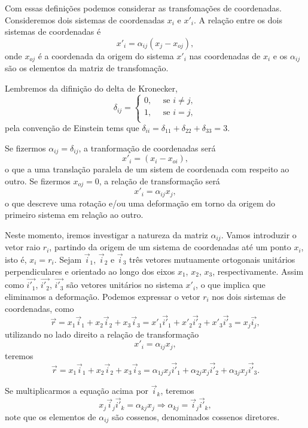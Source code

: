 Com essas defini\c{c}\~oes podemos considerar as
transfoma\c{c}\~oes de coordenadas. Consideremos dois sistemas de
 coordenadas $x_{i}$ e $x'_{i}$. A rela\c{c}\~ao entre os dois sistemas de coordenadas \'e
\[x'_{i}=\alpha_{ij}(x_{j}-x_{oj}),\]
onde $x_{oj}$ \'e a coordenada da origem do sistema $x'_{i}$ nas coordenadas de
$x_{i}$ e os $\alpha_{ij}$ s\~ao os elementos da matriz de
transfoma\c{c}\~ao.

Lembremos da difini\c{c}\~ao do delta de Kronecker,
\[\delta_{ij}=\left \{ \begin{array}{l}
                0, \mbox{   }\mbox{   }\mbox{se } i \neq j,\\
                1, \mbox{   }\mbox{   }\mbox{se } i= j,\\
\end{array} \right.\]
pela conven\c{c}\~ao de Einstein tems que
$\delta_{ii}=\delta_{11}+\delta_{22}+\delta_{33}=3$.

Se fizermos $\alpha_{ij}=\delta_{ij}$, a tranforma\c{c}\~ao de
coordenadas ser\'a
\[x'_{i}=(x_{i}-x_{oi}),\]
o que a uma transla\c{c}\~ao paralela de um sistem de coordenada
com respeito ao outro. Se fizermos  $x_{oj}=0$, a rela\c{c}\~ao de
transforma\c{c}\~ao ser\'a
\[x'_{i}=\alpha_{ij}x_{j},\]
o que descreve uma rota\c{c}\~ao e/ou uma deforma\c{c}\~ao em torno da origem do primeiro
sistema em rela\c{c}\~ao ao outro.

Neste momento, iremos investigar a natureza da matriz
$\alpha_{ij}$. Vamos introduzir o vetor raio $r_{i}$, partindo da
origem de um sistema de coordenadas at\'e um ponto $x_{i}$, isto
\'e, $x_{i}=r_{i}$. Sejam $\vec{i}_{1}$, $\vec{i}_{2}$ e
$\vec{i}_{3}$ tr\^es vetores mutuamente ortogonais unit\'arios
perpendiculares e orientado ao longo dos eixos $x_{1}$, $x_{2}$,
$x_{3}$, respectivamente. Assim como $\vec{i'_{1}}$,
$\vec{i'_{2}}$, $\vec{i'_{3}}$ s\~ao vetores unit\'arios no
sistema $x'_{i}$, o que implica que eliminamos a deforma\c{c}\~ao.
Podemos expressar o vetor $r_{i}$ nos dois sistemas de
coordenadas, como
\[ \vec{r}=x_{1}\vec{i}_{1}+x_{2}\vec{i}_{2}+x_{3}\vec{i}_{3}=x'_{1}\vec{i'}_{1}+
x'_{2}\vec{i'}_{2}+x'_{3}\vec{i'}_{3}=x_{j}\vec{i_{j}},\]
utilizando no lado direito a rela\c{c}\~ao de transforma\c{c}\~ao
\[x'_{i}=\alpha_{ij}x_{j},\]
teremos
\[\vec{r}=x_{1}\vec{i}_{1}+x_{2}\vec{i}_{2}+
x_{3}\vec{i}_{3}=\alpha_{1j}x_{j}\vec{i'}_{1}+
\alpha_{2j}x_{j}\vec{i'}_{2}+\alpha_{3j}x_{j}\vec{i'}_{3}.\]

Se multiplicarmos a equa\c{c}\~ao acima por $\vec{i}_{k}$, teremos
\[x_{j}\vec{i}_{j}\vec{i'}_{k}=
\alpha_{kj}x_{j} \Rightarrow
\alpha_{kj}=\vec{i}_{j}\vec{i'}_{k},\] note que os elementos de
$\alpha_{ij}$ s\~ao cossenos, denominados cossenos diretores.

